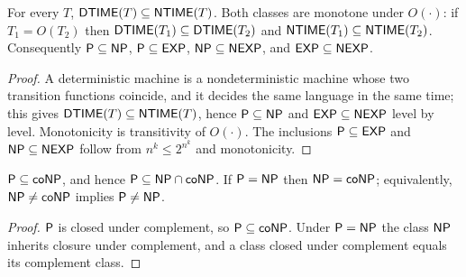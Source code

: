 \begin{theorem}
  \label{thm:polytime-P-subset-NP}
  \leanok
  For every $T$, $\mathsf{DTIME}(T) \subseteq \mathsf{NTIME}(T)$. Both classes are
  monotone under $O(\cdot)$: if $T_1 = O(T_2)$ then
  $\mathsf{DTIME}(T_1) \subseteq \mathsf{DTIME}(T_2)$ and
  $\mathsf{NTIME}(T_1) \subseteq \mathsf{NTIME}(T_2)$. Consequently
  $\mathsf{P} \subseteq \mathsf{NP}$, $\mathsf{P} \subseteq \mathsf{EXP}$,
  $\mathsf{NP} \subseteq \mathsf{NEXP}$, and $\mathsf{EXP} \subseteq \mathsf{NEXP}$.
\end{theorem}
\begin{proof}
  \leanok
  A deterministic machine is a nondeterministic machine whose two transition
  functions coincide, and it decides the same language in the same time; this
  gives $\mathsf{DTIME}(T) \subseteq \mathsf{NTIME}(T)$, hence
  $\mathsf{P} \subseteq \mathsf{NP}$ and $\mathsf{EXP} \subseteq \mathsf{NEXP}$ level by level.
  Monotonicity is transitivity of $O(\cdot)$. The inclusions
  $\mathsf{P} \subseteq \mathsf{EXP}$ and $\mathsf{NP} \subseteq \mathsf{NEXP}$ follow from
  $n^k \le 2^{n^k}$ and monotonicity.
\end{proof}

\begin{theorem}
  \label{thm:polytime-coNP-structure}
  \leanok
  $\mathsf{P} \subseteq \mathsf{coNP}$, and hence
  $\mathsf{P} \subseteq \mathsf{NP} \cap \mathsf{coNP}$. If $\mathsf{P} = \mathsf{NP}$ then
  $\mathsf{NP} = \mathsf{coNP}$; equivalently, $\mathsf{NP} \neq \mathsf{coNP}$ implies
  $\mathsf{P} \neq \mathsf{NP}$.
\end{theorem}
\begin{proof}
  \leanok
  $\mathsf{P}$ is closed under complement, so $\mathsf{P} \subseteq \mathsf{coNP}$. Under
  $\mathsf{P} = \mathsf{NP}$ the class $\mathsf{NP}$ inherits closure under complement, and
  a class closed under complement equals its complement class.
\end{proof}

